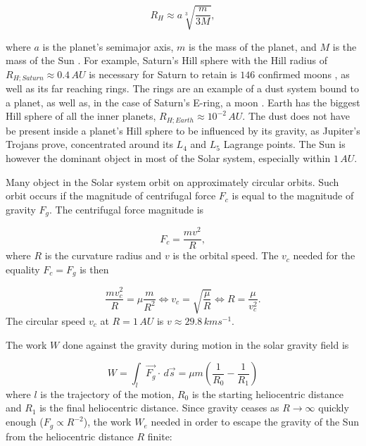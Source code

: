 \begin{equation}
    R_H \approx a \sqrt[3]{\frac{m}{3M}},
\end{equation}

where $a$ is the planet's semimajor axis, $m$ is the mass of the planet, and $M$ is the mass of the Sun \cite{sheppard2023new}. For example, Saturn's Hill sphere with the Hill radius of $R_{H;Saturn} \approx 0.4 \, \si{AU}$ is necessary for Saturn to retain is $146$ confirmed moons \citep{sheppard2023new}, as well as its far reaching rings. The rings are an example of a dust system bound to a planet, as well as, in the case of Saturn's E-ring, a moon \citep{kempf2010enceladus}. Earth has the biggest Hill sphere of all the inner planets, $R_{H;Earth} \approx 10^{-2} \, \si{AU}$. The dust does not have be present inside a planet's Hill sphere to be influenced by its gravity, as Jupiter's Trojans prove, concentrated around its $L_4$ and $L_5$ Lagrange points. The Sun is however the dominant object in most of the Solar system, especially within $1 \, \si{AU}$.

Many object in the Solar system orbit on approximately circular orbits. Such orbit occurs if the magnitude of centrifugal force $F_c$ is equal to the magnitude of gravity $F_g$. The centrifugal force magnitude is 

\begin{equation}
    F_c = \frac{m v^2}{R}, 
\end{equation}
where $R$ is the curvature radius and $v$ is the orbital speed. The $v_c$ needed for the equality $F_c = F_g$ is then

\begin{equation}
    \frac{m v_c^2}{R} = \mu \frac{m}{R^2} \Leftrightarrow v_c = \sqrt{\frac{\mu}{R}} \Leftrightarrow R = \frac{\mu}{v_c^2}.
    \label{eq:circular_speed}
\end{equation}
The circular speed $v_c$ at $R = 1 \, \si{AU}$ is $v \approx 29.8 \, \si{km s^{-1}}$. 

The work $W$ done against the gravity during motion in the solar gravity field is

\begin{equation}
    W = \int_{l} \vec{F_g} \cdot \, d\vec{s} = \mu m \left( \frac{1}{R_0} - \frac{1}{R_1} \right)
\end{equation}
where $l$ is the trajectory of the motion, $R_0$ is the starting heliocentric distance and $R_1$ is the final heliocentric distance. Since gravity ceases as $R \to \infty$ quickly enough ($F_g \propto R^{-2}$), the work $W_e$ needed in order to escape the gravity of the Sun from the heliocentric distance $R$ finite:

